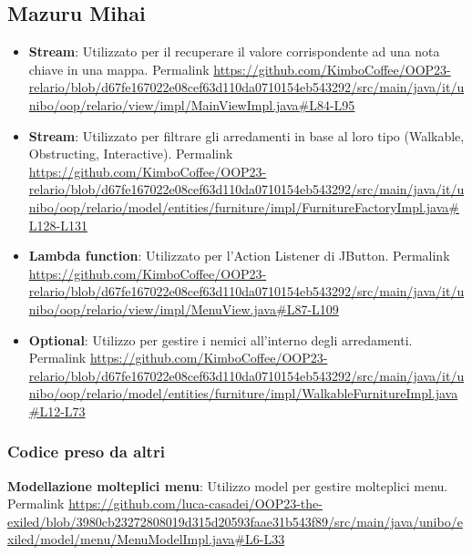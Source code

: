 \documentclass[a4paper,12pt]{report}
\begin{document}
\subsection{Mazuru Mihai}
\begin{itemize}
	\item \textbf{Stream}: Utilizzato per il recuperare il valore corrispondente ad una nota chiave in una mappa.
	Permalink \url{https://github.com/KimboCoffee/OOP23-relario/blob/d67fe167022e08cef63d110da0710154eb543292/src/main/java/it/unibo/oop/relario/view/impl/MainViewImpl.java#L84-L95}
    
	\item \textbf{Stream}: Utilizzato per filtrare gli arredamenti in base al loro tipo (Walkable, Obstructing, Interactive).
	Permalink \url{https://github.com/KimboCoffee/OOP23-relario/blob/d67fe167022e08cef63d110da0710154eb543292/src/main/java/it/unibo/oop/relario/model/entities/furniture/impl/FurnitureFactoryImpl.java#L128-L131}

	\item \textbf{Lambda function}: Utilizzato per l’Action Listener di JButton.
	Permalink \url{https://github.com/KimboCoffee/OOP23-relario/blob/d67fe167022e08cef63d110da0710154eb543292/src/main/java/it/unibo/oop/relario/view/impl/MenuView.java#L87-L109}

	\item \textbf{Optional}: Utilizzo per gestire i nemici all'interno degli arredamenti.
	Permalink \url{https://github.com/KimboCoffee/OOP23-relario/blob/d67fe167022e08cef63d110da0710154eb543292/src/main/java/it/unibo/oop/relario/model/entities/furniture/impl/WalkableFurnitureImpl.java#L12-L73}
\end{itemize}

\subsubsection{Codice preso da altri}
\textbf{Modellazione molteplici menu}: Utilizzo model per gestire molteplici menu.
Permalink \url{https://github.com/luca-casadei/OOP23-the-exiled/blob/3980cb23272808019d315d20593faae31b543f89/src/main/java/unibo/exiled/model/menu/MenuModelImpl.java#L6-L33}
\end{document}
